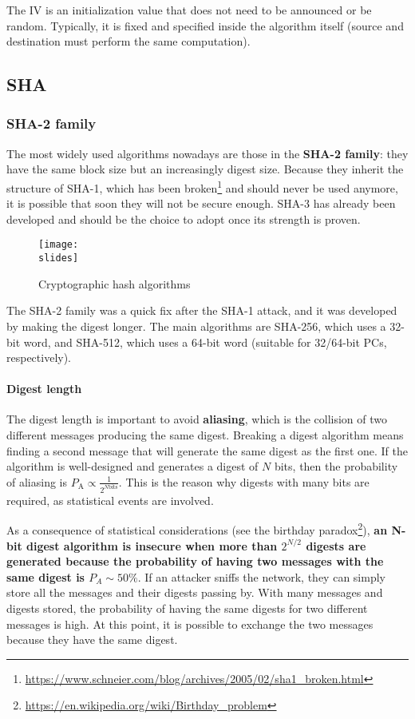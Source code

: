 The IV is an initialization value that does not need to be announced or be random. Typically, it is fixed and specified inside the algorithm itself (source and destination must perform the same computation).

\subsection{SHA}

\subsubsection{SHA-2 family}
The most widely used algorithms nowadays are those in the \textbf{SHA-2 family}: they have the same block size but an increasingly digest size. Because they inherit the structure of SHA-1, which has been broken\footnote{\url{https://www.schneier.com/blog/archives/2005/02/sha1_broken.html}} and should never be used anymore, it is possible that soon they will not be secure enough.
SHA-3 has already been developed and should be the choice to adopt once its strength is proven.

\begin{figure}[h]
    \centering
    \texttt{[image: \\slides]}
    \caption{Cryptographic hash algorithms}
\end{figure}


The SHA-2 family was a quick fix after the SHA-1 attack, and it was developed by making the digest longer. The main algorithms are SHA-256, which uses a 32-bit word, and SHA-512, which uses a 64-bit word (suitable for 32/64-bit PCs, respectively).

\paragraph{Digest length}
The digest length is important to avoid \textbf{aliasing}, which is the collision of two different messages producing the same digest. Breaking a digest algorithm means finding a second message that will generate the same digest as the first one. If the algorithm is well-designed and generates a digest of \(N\) bits, then the probability of aliasing is \(P_{\text{A}} \propto \frac{1}{2^{N \text{bits}}}\).
This is the reason why digests with many bits are required, as statistical events are involved.

As a consequence of statistical considerations (see the birthday paradox\footnote{\url{https://en.wikipedia.org/wiki/Birthday_problem}}), \textbf{an N-bit digest algorithm is insecure when more than \(2^{N/2}\) digests are generated because the probability of having two messages with the same digest is \(P_{A} \sim 50\%\)}. If an attacker sniffs the network, they can simply store all the messages and their digests passing by. With many messages and digests stored, the probability of having the same digests for two different messages is high. At this point, it is possible to exchange the two messages because they have the same digest.

